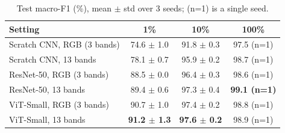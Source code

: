 \begin{table}[t]
\centering
\caption{Test macro-F1 (\%), mean $\pm$ std over 3 seeds; (n=1) is a single seed.}
\label{tab:supervised_f1}
\small
\begin{tabular}{lccc}
\toprule
Setting & 1\% & 10\% & 100\% \\
\midrule
Scratch CNN, RGB (3 bands) & 74.6 $\pm$ 1.0 & 91.8 $\pm$ 0.3 & 97.5 (n=1) \\
Scratch CNN, 13 bands & 78.1 $\pm$ 0.7 & 95.9 $\pm$ 0.2 & 98.7 (n=1) \\
ResNet-50, RGB (3 bands) & 88.5 $\pm$ 0.0 & 96.4 $\pm$ 0.3 & 98.6 (n=1) \\
ResNet-50, 13 bands & 89.4 $\pm$ 0.6 & 97.3 $\pm$ 0.4 & \textbf{99.1 (n=1)} \\
ViT-Small, RGB (3 bands) & 90.7 $\pm$ 1.0 & 97.4 $\pm$ 0.2 & 98.8 (n=1) \\
ViT-Small, 13 bands & \textbf{91.2 $\pm$ 1.3} & \textbf{97.6 $\pm$ 0.2} & 98.9 (n=1) \\
\bottomrule
\end{tabular}
\end{table}
